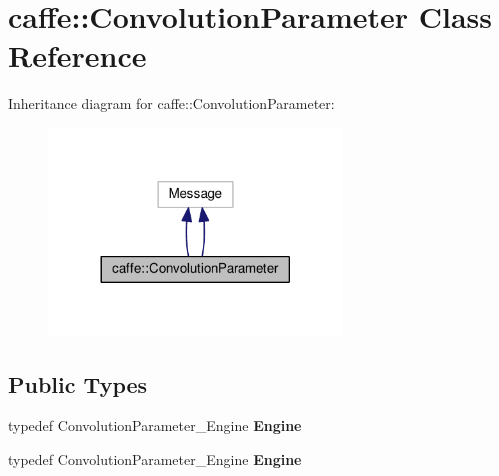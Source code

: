 \hypertarget{classcaffe_1_1_convolution_parameter}{}\section{caffe\+:\+:Convolution\+Parameter Class Reference}
\label{classcaffe_1_1_convolution_parameter}


Inheritance diagram for caffe\+:\+:Convolution\+Parameter\+:
\nopagebreak
\begin{figure}[H]
\begin{center}
\leavevmode
\includegraphics[width=221pt]{classcaffe_1_1_convolution_parameter__inherit__graph}
\end{center}
\end{figure}
\subsection*{Public Types}
\begin{DoxyCompactItemize}
\item 
\mbox{\label{classcaffe_1_1_convolution_parameter_a5707288309571c13d16c688f295c45e2}} 
typedef Convolution\+Parameter\+\_\+\+Engine {\bfseries Engine}
\item 
\mbox{\label{classcaffe_1_1_convolution_parameter_a5707288309571c13d16c688f295c45e2}} 
typedef Convolution\+Parameter\+\_\+\+Engine {\bfseries Engine}
\end{DoxyCompactItemize}
